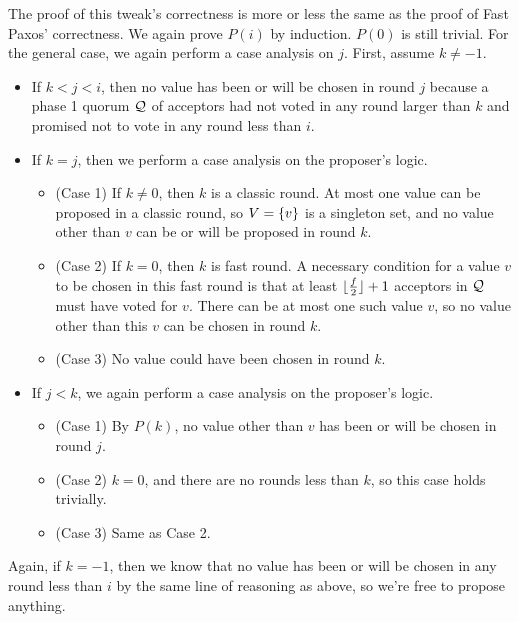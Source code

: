 The proof of this tweak's correctness is more or less the same as the proof of
Fast Paxos' correctness. We again prove $P(i)$ by induction. $P(0)$ is still
trivial. For the general case, we again perform a case analysis on $j$. First,
assume $k \neq -1$.
\begin{itemize}
  \item
    If $k < j < i$, then no value has been or will be chosen in round $j$
    because a phase 1 quorum $\mathcal{Q}$ of acceptors had not voted in any round
    larger than $k$ and promised not to vote in any round less than $i$.

  \item
    If $k = j$, then we perform a case analysis on the proposer's logic.
    \begin{itemize}
      \item
        (Case 1) If $k \neq 0$, then $k$ is a classic round. At most one value
        can be proposed in a classic round, so $V = \{v\}$ is a singleton
        set, and no value other than $v$ can be or will be proposed in round
        $k$.
      \item
        (Case 2) If $k = 0$, then $k$ is fast round. A necessary condition for
        a value $v$ to be chosen in this fast round is that at least
        $\lfloor\frac{f}{2}\rfloor + 1$ acceptors in $\mathcal{Q}$ must have voted for $v$.
        There can be at most one such value $v$, so no value other than this
        $v$ can be chosen in round $k$.
      \item
        (Case 3) No value could have been chosen in round $k$.
    \end{itemize}

  \item
    If $j < k$, we again perform a case analysis on the proposer's logic.
    \begin{itemize}
      \item
        (Case 1) By $P(k)$, no value other than $v$ has been or will be chosen
        in round $j$.
      \item
        (Case 2) $k = 0$, and there are no rounds less than $k$, so this case
        holds trivially.
      \item
        (Case 3) Same as Case 2.
    \end{itemize}
\end{itemize}
Again, if $k = -1$, then we know that no value has been or will be chosen in
any round less than $i$ by the same line of reasoning as above, so we're free
to propose anything.
